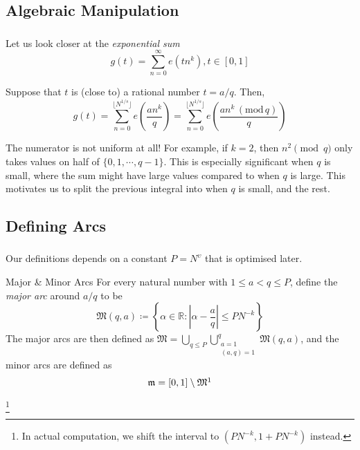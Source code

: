 
\subsection{Algebraic Manipulation}
\begin{frame}\frametitle{\insertsubsection}
Let us look closer at the \textit{exponential sum}
\[
  g(t) = \sum_{n = 0}^{\infty} e(tn^k), t \in [0, 1]
\]

Suppose that \(t\) is (close to) a rational number \(t = a / q\). Then,
\[
  g(t) = \sum_{n = 0}^{\lfloor N^{1 / s} \rfloor} e\left(\frac{an^k}{q}\right)
  = \sum_{n = 0}^{\lfloor N^{1 / s} \rfloor} e\left(\frac{an^k\,(\mathrm{mod}\,q)}{q}\right)
\]
\pause

The numerator is not uniform at all! For example, if \(k = 2\), then \(n^2 \pmod{q}\) only takes values on half of \(\{0, 1, \cdots, q - 1\}\).
\pause
This is especially significant when \(q\) is small, where the sum might have large values compared to when \(q\) is large. This motivates us to split the previous integral into when \(q\) is small, and the rest.
\end{frame}


\subsection{Defining Arcs}
\begin{frame}\frametitle{\insertsubsection}
Our definitions depends on a constant \(P = N^{\upsilon}\) that is optimised later.
\begin{block}{Major \& Minor Arcs}
  For every natural number with \(1 \leq a < q \leq P\), define the \textit{major arc} around \(a / q\) to be
\[
  \mathfrak{M}(q, a) \coloneqq \left\{\alpha \in \mathbb{R} : \left|\alpha - \frac{a}{q}\right| \leq PN^{-k}\right\}
\]
  The major arcs are then defined as \(\mathfrak{M} = \bigcup_{q \leq P} \bigcup_{\substack{a = 1 \\ (a, q) = 1}}^q \mathfrak{M}(q, a)\), and the minor arcs are defined as
\[
  \mathfrak{m} = [0, 1] \setminus \mathfrak{M} \footnotemark
\]
\end{block}
\footnote{In actual computation, we shift the interval to \((PN^{-k}, 1 + PN^{-k})\) instead.}
\end{frame}

